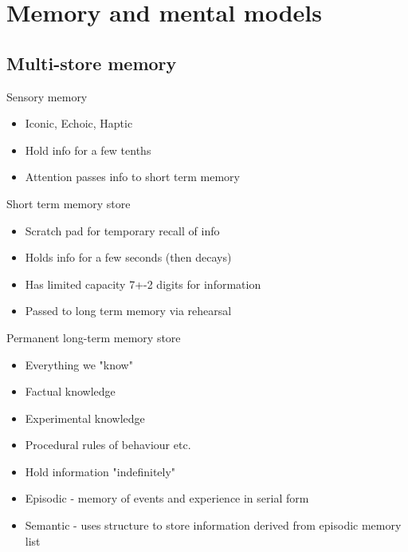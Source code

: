 \documentclass{article}[18pt]
\begin{document}
\section{Memory and mental models}
\subsection{Multi-store memory}
Sensory memory
\begin{itemize}
	\item Iconic, Echoic, Haptic
	\item Hold info for a few tenths
	\item Attention passes info to short term memory
\end{itemize}
Short term memory store
\begin{itemize}
	\item Scratch pad for temporary recall of info
	\item Holds info for a few seconds (then decays)
	\item Has limited capacity 7+-2 digits for information
	\item Passed to long term memory via rehearsal 
\end{itemize}
Permanent long-term memory store
\begin{itemize}
	\item Everything we "know"
	\item Factual knowledge
	\item Experimental knowledge
	\item Procedural rules of behaviour etc.
	\item Hold information "indefinitely"
	\item Episodic - memory of events and experience in serial form
	\item Semantic - uses structure to store information derived from episodic memory list
\end{itemize}
\end{document}
